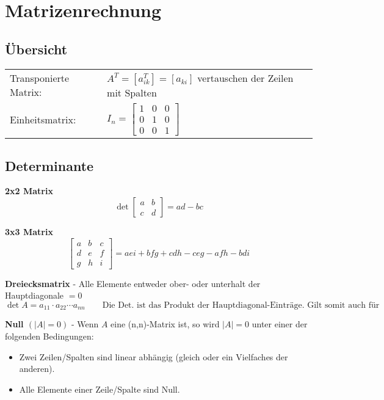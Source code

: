 \section{Matrizenrechnung}
\subsection{Übersicht}
	\begin{tabular}{l l}
    	Transponierte Matrix: & $A^T=[a_{ik}^T]=[a_{ki}]$ vertauschen der Zeilen
    	mit Spalten\\
    	Einheitsmatrix:& $I_n= 
			    	\begin{bmatrix} 
			        	1&0 & 0\\
			        	0&1&0\\
			        	0&0&1                               
			        \end{bmatrix}
$		    
    \end{tabular}

\subsection{Determinante}
\begin{minipage}[t]{6cm}
  \textbf{2x2 Matrix}    
	\[ \det \begin{bmatrix}
      a & b \\
      c & d
    \end{bmatrix} = ad - bc \]
\end{minipage}
\begin{minipage}[t]{12cm}
  \textbf{3x3 Matrix}
    \[\begin{bmatrix}
      a & b & c \\
      d & e & f \\
      g & h & i 
    \end{bmatrix} = aei + bfg + cdh - ceg - afh - bdi \]
\end{minipage}
	
	\textbf{Dreiecksmatrix} - Alle Elemente entweder ober- oder unterhalt der Hauptdiagonale $= 0$
	$$\det A =a_{11}\cdot a_{22}\dotsb a_{nn} \quad  \quad \text{Die Det. ist das Produkt
	der Hauptdiagonal-Einträge. Gilt somit auch für Diagonalmatritzen.} $$
	
	\textbf{Null $(|A| = 0)$} - Wenn $A$ eine (n,n)-Matrix ist, so wird $|A| = 0$ unter einer der
	folgenden Bedingungen:
	\begin{itemize}
    	\item Zwei Zeilen/Spalten sind linear abhängig (gleich oder ein Vielfaches der anderen).
    	\item Alle Elemente einer Zeile/Spalte sind Null. \\
  	\end{itemize} 
	
